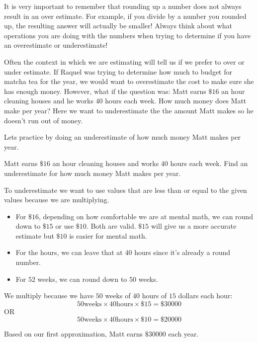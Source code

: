 \documentclass{ximera}
\begin{document}
\begin{remark}
It is very important to remember that rounding up a number does not always result in an over estimate.  For example, if you divide by a number you rounded up, the resulting answer will actually be smaller!  Always think about what operations you are doing with the numbers when trying to determine if you have an overestimate or underestimate!
\end{remark}

Often the context in which we are estimating will tell us if we prefer to over or under estimate.  If Raquel was trying to determine how much to budget for matcha tea for the year, we would want to overestimate the cost to make sure she has enough money.  However, what if the question was: Matt earns $\$16$ an hour cleaning houses and he works $40$ hours each week. How much money does Matt make per year? Here we want to underestimate the the amount Matt makes so he doesn't run out of money. 

Lets practice by doing an underestimate of how much money Matt makes per year.

\begin{example}
 Matt earns $\$16$ an hour cleaning houses and works $40$ hours each week. Find an underestimate for how much money Matt makes per year.

\begin{explanation}
To underestimate we want to use values that are less than or equal to the given values because we are multiplying. 
\begin{itemize}
\item For $\$16$, depending on how comfortable we are at mental math, we can round down to $\$15$ or use $\$10$. Both are valid. $\$15$ will give us a more accurate estimate but $\$10$ is easier for mental math.  
\item For the hours, we can leave that at $40$ hours since it's already a round number.
\item For $52$ weeks, we can round down to $50$ weeks.
\end{itemize}

We multiply because we have $50$ weeks of $40$ hours of $15$ dollars each hour:
$$50 \text{weeks} \times 40 \text{hours} \times \$15 =\$30000$$
OR $$50 \text{weeks} \times 40 \text{hours} \times \$10 =\$20000$$

Based on our first approximation, Matt earns $\$30000$ each year.
\end{explanation}
\end{example}
\end{document}

